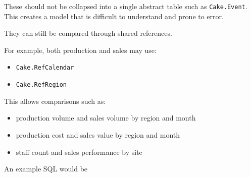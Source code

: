 \documentclass[10pt,openany,10pt]{book}
\providecommand{\tightlist}{%
  \setlength{\itemsep}{0pt}\setlength{\parskip}{0pt}}
\begin{document}
These should not be collapsed into a single abstract table such as
\texttt{Cake.Event}. This creates a model that is difficult to
understand and prone to error.

They can still be compared through shared references.

For example, both production and sales may use:

\begin{itemize}
\tightlist
\item
  \texttt{Cake.RefCalendar}
\item
  \texttt{Cake.RefRegion}
\end{itemize}

This allows comparisons such as:

\begin{itemize}
\tightlist
\item
  production volume and sales volume by region and month
\item
  production cost and sales value by region and month
\item
  staff count and sales performance by site
\end{itemize}

An example SQL would be
\end{document}
